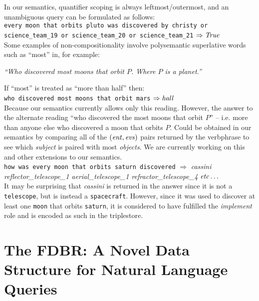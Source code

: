 \documentclass[../main.tex]{subfiles}
\begin{document}
\begin{refsection}
In our semantics, quantifier scoping is always leftmost/outermost, and an unambiguous query can be formulated as follows: \\

\noindent \texttt{every moon that orbits pluto was discovered by christy or \\ science\_team\_19 or science\_team\_20 or science\_team\_21} $\Rightarrow \mathit{True}$ \\

Some examples of non-compositionality involve polysemantic superlative words such as ``most'' in, for example:
\begin{center}
	\textit{``Who discovered most moons that orbit $P$. Where $P$ is a planet.''}
\end{center}
If ``most'' is treated as ``more than half'' then: \\

\noindent \texttt{who discovered most moons that orbit mars} $\Rightarrow \mathit{hall}$ \\

Because our semantics currently allows only this reading. However, the answer to the alternate reading ``who discovered the most moons that orbit $P$'' – i.e. more than anyone else who discovered a moon that orbits $P$. Could be obtained in our semantics by comparing all of the $(\mathit{ent}, \mathit{evs})$ pairs returned by the verbphrase to see which \textit{subject} is paired with most \textit{objects}. We are currently working on this and other extensions to our semantics. \\ %

\noindent \texttt{how was every moon that orbits saturn discovered} $\Rightarrow$ \textit{cassini \\ reflector\_telescope\_1 aerial\_telescope\_1 refractor\_telescope\_4} $\mathit{etc}\ldots$ \\

It may be surprising that \textit{cassini} is returned in the answer since it is not a \texttt{telescope}, but is instead a \texttt{spacecraft}.  However, since it was used to discover at least one \texttt{moon} that orbits \texttt{saturn}, it is considered to have fulfilled the \textit{implement} role and is encoded as such in the triplestore.

\section{The FDBR: A Novel Data Structure for Natural Language Queries}
\label{webist2019conf:album}


\end{refsection}
\end{document}
